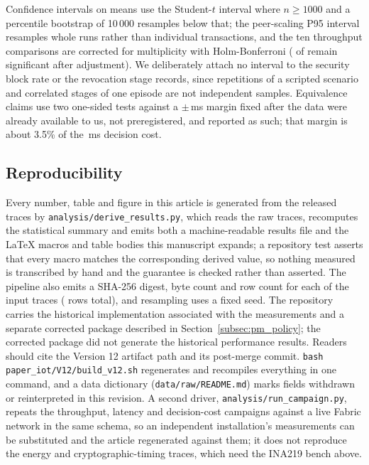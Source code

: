 \documentclass[a4paper,fleqn]{cas-dc}
\begin{document}
Confidence intervals on means use the Student-$t$ interval where
$n \ge 1000$ and a percentile bootstrap of 10\,000 resamples below that;
the peer-scaling P95 interval resamples whole runs rather than individual
transactions, and the ten throughput comparisons are corrected for
multiplicity with Holm-Bonferroni (\OverheadHolmSig{} of \OverheadLevels{}
remain significant after adjustment). We deliberately attach no interval
to the security block rate or the revocation stage records, since
repetitions of a scripted scenario and correlated stages of one episode
are not independent samples. Equivalence claims use two one-sided tests
against a $\pm$\DecisionMargin\,ms margin fixed after the data were
already available to us, not preregistered, and reported as such; that
margin is about 3.5\% of the \DecisionMean\,ms decision cost.

\subsection{Reproducibility}
\label{subsec:repro}

Every number, table and figure in this article is generated from the
released traces by \texttt{analysis/derive\_results.py}, which reads the
raw traces, recomputes the statistical summary and emits both a
machine-readable results file and the LaTeX macros and table bodies this
manuscript expands; a repository test asserts that every macro matches the
corresponding derived value, so nothing measured is transcribed by hand
and the guarantee is checked rather than asserted. The pipeline also emits
a SHA-256 digest, byte count and row count for each of the \TraceCount{}
input traces (\TraceRows{} rows total), and resampling uses a fixed seed.
The repository carries the historical implementation associated with the
measurements and a separate corrected package described in
Section~\ref{subsec:pm_policy}; the corrected package did not generate the
historical performance results. Readers should cite the Version 12 artifact
path and its post-merge commit. \texttt{bash
paper\_iot/V12/build\_v12.sh} regenerates and recompiles everything in one
command, and a data dictionary (\texttt{data/raw/README.md}) marks fields
withdrawn or reinterpreted in this revision. A second driver,
\texttt{analysis/run\_campaign.py}, repeats the throughput, latency and
decision-cost campaigns against a live Fabric network in the same schema,
so an independent installation's measurements can be substituted and the
article regenerated against them; it does not reproduce the energy and
cryptographic-timing traces, which need the INA219 bench above.
\end{document}
